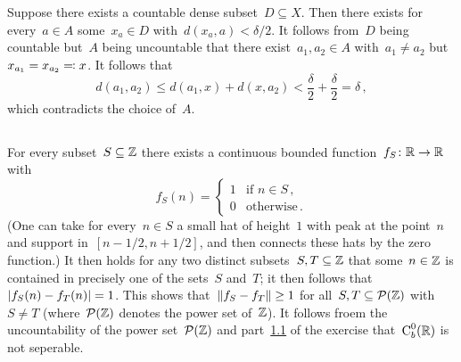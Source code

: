 \section{}



\subsection{}
\label{criterion for nonseperable}

Suppose there exists a countable dense subset~$D \subseteq X$.
Then there exists for every~$a \in A$ some~$x_a \in D$ with~$d(x_a, a) < \delta/2$.
It follows from~$D$ being countable but~$A$ being uncountable that there exist~$a_1, a_2 \in A$ with~$a_1 \neq a_2$ but~$x_{a_1} = x_{a_2} \eqqcolon x$.
It follows that
\[
        d(a_1, a_2)
  \leq  d(a_1, x) + d(x, a_2)
  <     \frac{\delta}{2} + \frac{\delta}{2}
  =     \delta \,,
\]
which contradicts the choice of~$A$.





\subsection{}

For every subset~$S \subseteq \mathbb{Z}$ there exists a continuous bounded function~$f_S \colon \mathbb{R} \to \mathbb{R}$ with
\[
    f_S(n)
  = \begin{cases}
      1 & \text{if~$n \in S$} \,, \\
      0 & \text{otherwise} \,.
    \end{cases}
\]
(One can take for every~$n \in S$ a small hat of height~$1$ with peak at the point~$n$ and support in~$[n - 1/2, n + 1/2]$, and then connects these hats by the zero function.)
It then holds for any two distinct subsets~$S, T \subseteq \mathbb{Z}$ that some~$n \in \mathbb{Z}$ is contained in precisely one of the sets~$S$ and~$T$;
it then follows that~$\lvert f_S(n) - f_T(n)\rvert = 1$.
This shows that~$\lVert f_S - f_T\rVert \geq 1$ for all~$S, T \subseteq \mathcal{P}(\mathbb{Z})$ with~$S \neq T$ (where~$\mathcal{P}(\mathbb{Z})$ denotes the power set of~$\mathbb{Z}$).
It follows froem the uncountability of the power set~$\mathcal{P}(\mathbb{Z})$ and part~\ref{criterion for nonseperable} of the exercise that~$\operatorname{C}^0_b(\mathbb{R})$ is not seperable.





\subsection{}

